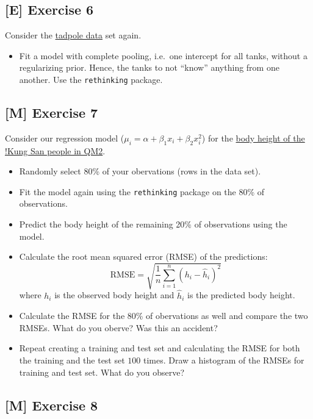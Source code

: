 \documentclass[
]{book}
\providecommand{\tightlist}{%
  \setlength{\itemsep}{0pt}\setlength{\parskip}{0pt}}
\begin{document}
\subsection{{[}E{]} Exercise 6}\label{exercise6_LMM}

Consider the \hyperref[tadpole]{tadpole data} set again.

\begin{itemize}
\tightlist
\item
  Fit a model with complete pooling, i.e.~one intercept for all tanks, without a regularizing prior.
  Hence, the tanks to not ``know'' anything from one another. Use the \texttt{rethinking} package.
\end{itemize}

\subsection{{[}M{]} Exercise 7}\label{exercise7_LMM}

Consider our regression model (\(\mu_i = \alpha + \beta_1 x_i + \beta_2 x_i^2\))
for the \href{https://jdegenfellner.github.io/Script_QM2_ZHAW/multiple-linear-regression.html\#adding_transformed_predictor_bayes}{body height of the !Kung San people in QM2}.

\begin{itemize}
\tightlist
\item
  Randomly select 80\% of your obervations (rows in the data set).
\item
  Fit the model again using the \texttt{rethinking} package on the 80\% of observations.
\item
  Predict the body height of the remaining 20\% of observations using the model.
\item
  Calculate the root mean squared error (RMSE) of the predictions:
  \[ \text{RMSE} = \sqrt{\frac{1}{n}\sum_{i=1}^n (h_i - \hat{h}_i)^2}\]
  where \(h_i\) is the observed body height and \(\hat{h}_i\) is the predicted body height.
\item
  Calculate the RMSE for the 80\% of obervations as well and compare the two RMSEs.
  What do you oberve? Was this an accident?
\item
  Repeat creating a training and test set and calculating the RMSE
  for both the training and the test set \(100\) times. Draw a histogram of the RMSEs for training and
  test set. What do you observe?
\end{itemize}

\subsection{{[}M{]} Exercise 8}\label{exercise8_LMM}
\end{document}
